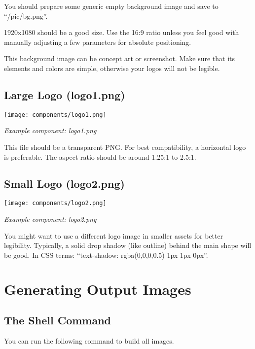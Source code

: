 \documentclass[11pt,a4paper]{report}
\begin{document}
You should prepare some generic empty background image and save to ``/pic/bg.png''.

1920x1080 should be a good size.
Use the 16:9 ratio unless you feel good with manually adjusting a few parameters for absolute positioning.

This background image can be concept art or screenshot.
Make sure that its elements and colors are simple, otherwise your logos will not be legible.

\section{Large Logo (logo1.png)}
\begin{minipage}{\linewidth}
	\center\sffamily
	\colorbox{white!75!gray}{\texttt{[image: components/logo1.png]}}\par
	\small\itshape
	Example component: logo1.png
\end{minipage}


This file should be a transparent PNG.
For best compatibility, a horizontal logo is preferable.
The aspect ratio should be around 1.25:1 to 2.5:1.

\section{Small Logo (logo2.png)}
\begin{minipage}{\linewidth}
	\center\sffamily
	\colorbox{white!75!gray}{\texttt{[image: components/logo2.png]}}\par
	\small\itshape
	Example component: logo2.png
\end{minipage}

You might want to use a different logo image in smaller assets for better legibility.
Typically, a solid drop shadow (like outline) behind the main shape will be good.
In CSS terms: ``text-shadow: rgba(0,0,0,0.5) 1px 1px 0px''.





\chapter{Generating Output Images}

\section{The Shell Command}
You can run the following command to build all images.
\end{document}
